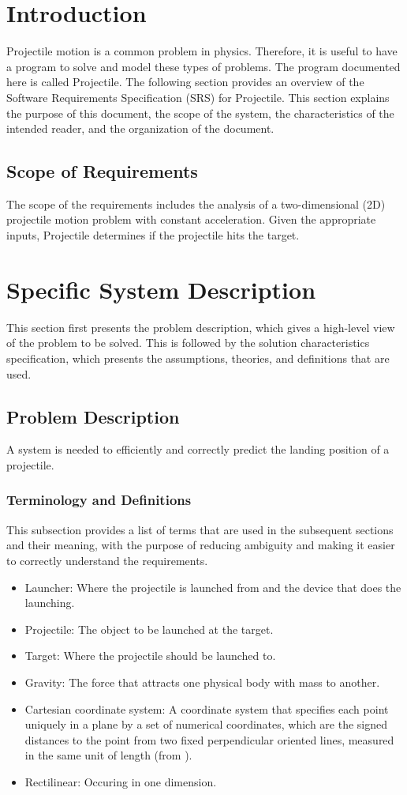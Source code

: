 \documentclass[12pt]{article}
\begin{document}
\section{Introduction}
\label{Sec:Intro}
Projectile motion is a common problem in physics. Therefore, it is useful to have a program to solve and model these types of problems. The program documented here is called Projectile.
The following section provides an overview of the Software Requirements Specification (SRS) for Projectile. This section explains the purpose of this document, the scope of the system, the characteristics of the intended reader, and the organization of the document.
\subsection{Scope of Requirements}
\label{Sec:ReqsScope}
The scope of the requirements includes the analysis of a two-dimensional (2D) projectile motion problem with constant acceleration. Given the appropriate inputs, Projectile determines if the projectile hits the target.
\section{Specific System Description}
\label{Sec:SpecSystDesc}
This section first presents the problem description, which gives a high-level view of the problem to be solved. This is followed by the solution characteristics specification, which presents the assumptions, theories, and definitions that are used.
\subsection{Problem Description}
\label{Sec:ProbDesc}
A system is needed to efficiently and correctly predict the landing position of a projectile.
\subsubsection{Terminology and Definitions}
\label{Sec:TermDefs}
This subsection provides a list of terms that are used in the subsequent sections and their meaning, with the purpose of reducing ambiguity and making it easier to correctly understand the requirements.
\begin{itemize}
\item{Launcher: Where the projectile is launched from and the device that does the launching.}
\item{Projectile: The object to be launched at the target.}
\item{Target: Where the projectile should be launched to.}
\item{Gravity: The force that attracts one physical body with mass to another.}
\item{Cartesian coordinate system: A coordinate system that specifies each point uniquely in a plane by a set of numerical coordinates, which are the signed distances to the point from two fixed perpendicular oriented lines, measured in the same unit of length (from \cite{cartesianWiki}).}
\item{Rectilinear: Occuring in one dimension.}
\end{itemize}
\end{document}
